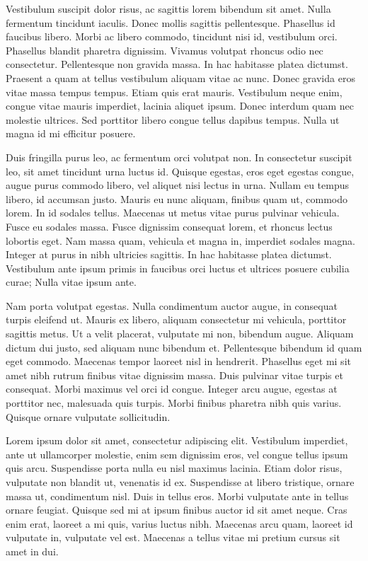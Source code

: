 \begin{refsection}
Vestibulum suscipit dolor risus, ac sagittis lorem bibendum sit amet. Nulla fermentum tincidunt iaculis. Donec mollis sagittis pellentesque. Phasellus id faucibus libero. Morbi ac libero commodo, tincidunt nisi id, vestibulum orci. Phasellus blandit pharetra dignissim. Vivamus volutpat rhoncus odio nec consectetur. Pellentesque non gravida massa. In hac habitasse platea dictumst. Praesent a quam at tellus vestibulum aliquam vitae ac nunc. Donec gravida eros vitae massa tempus tempus. Etiam quis erat mauris. Vestibulum neque enim, congue vitae mauris imperdiet, lacinia aliquet ipsum. Donec interdum quam nec molestie ultrices. Sed porttitor libero congue tellus dapibus tempus. Nulla ut magna id mi efficitur posuere.

Duis fringilla purus leo, ac fermentum orci volutpat non. In consectetur suscipit leo, sit amet tincidunt urna luctus id. Quisque egestas, eros eget egestas congue, augue purus commodo libero, vel aliquet nisi lectus in urna. Nullam eu tempus libero, id accumsan justo. Mauris eu nunc aliquam, finibus quam ut, commodo lorem. In id sodales tellus. Maecenas ut metus vitae purus pulvinar vehicula. Fusce eu sodales massa. Fusce dignissim consequat lorem, et rhoncus lectus lobortis eget. Nam massa quam, vehicula et magna in, imperdiet sodales magna. Integer at purus in nibh ultricies sagittis. In hac habitasse platea dictumst. Vestibulum ante ipsum primis in faucibus orci luctus et ultrices posuere cubilia curae; Nulla vitae ipsum ante.

Nam porta volutpat egestas. Nulla condimentum auctor augue, in consequat turpis eleifend ut. Mauris ex libero, aliquam consectetur mi vehicula, porttitor sagittis metus. Ut a velit placerat, vulputate mi non, bibendum augue. Aliquam dictum dui justo, sed aliquam nunc bibendum et. Pellentesque bibendum id quam eget commodo. Maecenas tempor laoreet nisl in hendrerit. Phasellus eget mi sit amet nibh rutrum finibus vitae dignissim massa. Duis pulvinar vitae turpis et consequat. Morbi maximus vel orci id congue. Integer arcu augue, egestas at porttitor nec, malesuada quis turpis. Morbi finibus pharetra nibh quis varius. Quisque ornare vulputate sollicitudin.

Lorem ipsum dolor sit amet, consectetur adipiscing elit. Vestibulum imperdiet, ante ut ullamcorper molestie, enim sem dignissim eros, vel congue tellus ipsum quis arcu. Suspendisse porta nulla eu nisl maximus lacinia. Etiam dolor risus, vulputate non blandit ut, venenatis id ex. Suspendisse at libero tristique, ornare massa ut, condimentum nisl. Duis in tellus eros. Morbi vulputate ante in tellus ornare feugiat. Quisque sed mi at ipsum finibus auctor id sit amet neque. Cras enim erat, laoreet a mi quis, varius luctus nibh. Maecenas arcu quam, laoreet id vulputate in, vulputate vel est. Maecenas a tellus vitae mi pretium cursus sit amet in dui.


\end{refsection}
